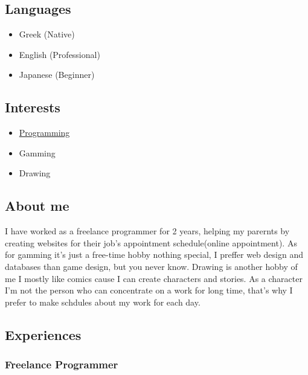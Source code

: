 \documentclass[english,]{article}
\providecommand{\tightlist}{%
  \setlength{\itemsep}{0pt}\setlength{\parskip}{0pt}}
\begin{document}
\hypertarget{languages}{%
\subsection{Languages}\label{languages}}

\begin{itemize}
\tightlist
\item
  Greek {(Native)}
\item
  English {(Professional)}
\item
  Japanese {(Beginner)}
\end{itemize}

\hypertarget{interests}{%
\subsection{Interests}\label{interests}}

\begin{itemize}
\tightlist
\item
  \href{https://github.com/xar1sgeovlacp2019059}{Programming}
\item
  Gamming
\item
  Drawing
\end{itemize}

\hypertarget{about-me}{%
\subsection{\texorpdfstring{{ \emph{} \emph{} } About
me}{    About me}}\label{about-me}}

I have worked as a freelance programmer for 2 years, helping my parernts
by creating websites for their job's appointment schedule(online
appointment). As for gamming it's just a free-time hobby nothing
special, I preffer web design and databases than game design, but you
never know. Drawing is another hobby of me I mostly like comics cause I
can create characters and stories. As a character I'm not the person who
can concentrate on a work for long time, that's why I prefer to make
schdules about my work for each day.

\hypertarget{experiences}{%
\subsection{\texorpdfstring{{ \emph{} \emph{} }
Experiences}{    Experiences}}\label{experiences}}

\hypertarget{freelance-programmer}{%
\subsubsection{Freelance Programmer}\label{freelance-programmer}}
\end{document}
